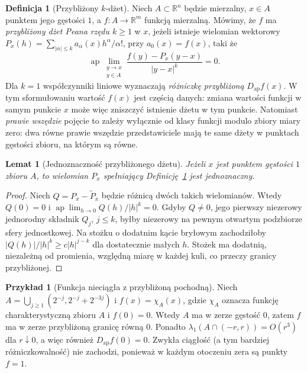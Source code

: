 \documentclass[11pt,a4paper,oneside]{book}
\numberwithin{equation}{chapter}
\theoremstyle{plain}
\newtheorem{lemat}[twierdzenie]{Lemat}
\theoremstyle{definition}
\newtheorem{definicja}[twierdzenie]{Definicja}
\newtheorem{przyklad}[twierdzenie]{Przykład}
\theoremstyle{remark}
\begin{document}
\begin{definicja}[Przybliżony $k$-dżet]
\label{def:dzety-approx-jet}
Niech $A\subset\mathbb R^n$ będzie mierzalny,
$x\in A$ punktem jego gęstości $1$, a
$f:A\to\mathbb R^m$ funkcją mierzalną.
Mówimy, że $f$ ma \emph{przybliżony dżet Peana rzędu $k\ge1$}
w $x$, jeżeli istnieje wielomian wektorowy
$P_x(h)=\sum_{|\alpha|\le k}a_\alpha(x)h^\alpha/\alpha!$,
przy $a_0(x)=f(x)$, taki że
\[
 \operatorname{ap}\!\lim_{\substack{y\to x\\y\in A}}
 \frac{f(y)-P_x(y-x)}{|y-x|^k}=0.
\]
Dla $k=1$ współczynniki liniowe wyznaczają
\emph{różniczkę przybliżoną} $D_{\mathrm{ap}}f(x)$.
W tym sformułowaniu wartość $f(x)$ jest częścią danych:
zmiana wartości funkcji w samym punkcie $x$ może więc
zniszczyć istnienie dżetu w tym punkcie. Natomiast
\emph{prawie wszędzie} pojęcie to zależy wyłącznie od
klasy funkcji modulo zbiory miary zero: dwa równe prawie
wszędzie przedstawiciele mają te same dżety w punktach
gęstości zbioru, na którym są równe.
\end{definicja}

\begin{lemat}[Jednoznaczność przybliżonego dżetu]
\label{lem:dzety-approx-unique}
Jeżeli $x$ jest punktem gęstości $1$ zbioru $A$,
to wielomian $P_x$ spełniający
Definicję~\ref{def:dzety-approx-jet} jest jednoznaczny.
\end{lemat}
\begin{proof}
Niech $Q=P_x-\widetilde P_x$ będzie różnicą dwóch takich
wielomianów. Wtedy $Q(0)=0$ i
$\operatorname{ap}\!\lim_{h\to0}Q(h)/|h|^k=0$.
Gdyby $Q\ne0$, jego pierwszy niezerowy jednorodny składnik
$Q_j$, $j\le k$, byłby niezerowy na pewnym otwartym
podzbiorze sfery jednostkowej. Na stożku o dodatnim kącie
bryłowym zachodziłoby
$|Q(h)|/|h|^k\ge c|h|^{j-k}$ dla dostatecznie małych $h$.
Stożek ma dodatnią, niezależną od promienia, względną miarę
w każdej kuli, co przeczy granicy przybliżonej.
\end{proof}

\begin{przyklad}[Funkcja nieciągła z przybliżoną pochodną]
\label{ex:dzety-approx}
Niech $A=\bigcup_{j\ge1}(2^{-j},2^{-j}+2^{-3j})$
i $f(x)=\chi_A(x)$, gdzie $\chi_A$ oznacza funkcję
charakterystyczną zbioru $A$ i $f(0)=0$. Wtedy $A$ ma
w zerze gęstość $0$, zatem $f$ ma w zerze przybliżoną
granicę równą $0$. Ponadto
$\lambda_1(A\cap(-r,r))=O(r^3)$ dla $r\downarrow0$,
a więc również $D_{\mathrm{ap}}f(0)=0$.
Zwykła ciągłość (a tym bardziej różniczkowalność) nie zachodzi,
ponieważ w każdym otoczeniu zera są punkty $f=1$.
\end{przyklad}
\end{document}
